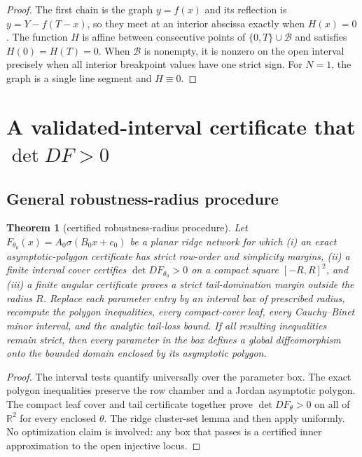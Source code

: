 \documentclass[11pt,twoside,leqno]{article}
\theoremstyle{plain}
\newtheorem{theorem}{Theorem}[section]
\theoremstyle{definition}
\theoremstyle{remark}
\newcommand{\R}{\mathbb{R}}
\begin{document}
\begin{proof}
The first chain is the graph $y=f(x)$ and its reflection is $y=Y-f(T-x)$, so they meet at an interior abscissa exactly when $H(x)=0$. The function $H$ is affine between consecutive points of $\{0,T\}\cup\mathcal B$ and satisfies $H(0)=H(T)=0$.  When $\mathcal B$ is nonempty, it is nonzero on the open interval precisely when all interior breakpoint values have one strict sign.  For $N=1$, the graph is a single line segment and $H\equiv0$.
\end{proof}

\section{A validated-interval certificate that \texorpdfstring{$\det DF>0$}{det DF>0}}\label{app:det}

\subsection{General robustness-radius procedure}\label{app:radius-procedure}

\begin{theorem}[certified robustness-radius procedure]\label{thm:radius-procedure}
Let $F_{\theta_0}(x)=A_0\sigma(B_0x+c_0)$ be a planar ridge network for which (i) an exact asymptotic-polygon certificate has strict row-order and simplicity margins, (ii) a finite interval cover certifies $\det DF_{\theta_0}>0$ on a compact square $[-R,R]^2$, and (iii) a finite angular certificate proves a strict tail-domination margin outside the radius $R$.  Replace each parameter entry by an interval box of prescribed radius, recompute the polygon inequalities, every compact-cover leaf, every Cauchy--Binet minor interval, and the analytic tail-loss bound.  If all resulting inequalities remain strict, then every parameter in the box defines a global diffeomorphism onto the bounded domain enclosed by its asymptotic polygon.
\end{theorem}

\begin{proof}
The interval tests quantify universally over the parameter box.  The exact polygon inequalities preserve the row chamber and a Jordan asymptotic polygon. The compact leaf cover and tail certificate together prove $\det DF_\theta>0$ on all of $\R^2$ for every enclosed $\theta$.  The ridge cluster-set lemma and  then apply uniformly.  No optimization claim is involved: any box that passes is a certified inner approximation to the open injective locus.
\end{proof}
\end{document}
